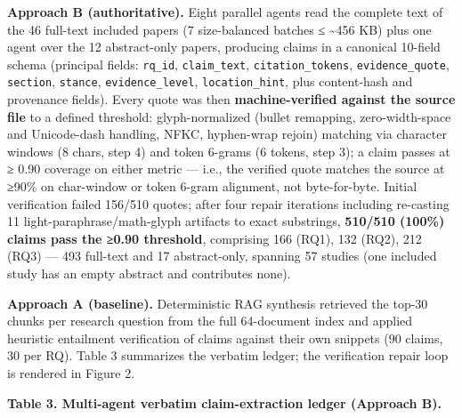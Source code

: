 \documentclass[11pt]{article}
\newcounter{none} %
\begin{document}
\textbf{Approach B (authoritative).} Eight parallel agents read the
complete text of the 46 full-text included papers (7 size-balanced
batches ≤ \textasciitilde456 KB) plus one agent over the 12
abstract-only papers, producing claims in a canonical 10-field schema
(principal fields: \texttt{rq\_id}, \texttt{claim\_text},
\texttt{citation\_tokens}, \texttt{evidence\_quote}, \texttt{section},
\texttt{stance}, \texttt{evidence\_level}, \texttt{location\_hint}, plus
content-hash and provenance fields). Every quote was then
\textbf{machine-verified against the source file} to a defined
threshold: glyph-normalized (bullet remapping, zero-width-space and
Unicode-dash handling, NFKC, hyphen-wrap rejoin) matching via character
windows (8 chars, step 4) and token 6-grams (6 tokens, step 3); a claim
passes at ≥ 0.90 coverage on either metric --- i.e., the verified quote
matches the source at ≥90\% on char-window or token 6-gram alignment,
not byte-for-byte. Initial verification failed 156/510 quotes; after
four repair iterations including re-casting 11
light-paraphrase/math-glyph artifacts to exact substrings,
\textbf{510/510 (100\%) claims pass the ≥0.90 threshold}, comprising 166
(RQ1), 132 (RQ2), 212 (RQ3) --- 493 full-text and 17 abstract-only,
spanning 57 studies (one included study has an empty abstract and
contributes none).

\textbf{Approach A (baseline).} Deterministic RAG synthesis retrieved
the top-30 chunks per research question from the full 64-document index
and applied heuristic entailment verification of claims against their
own snippets (90 claims, 30 per RQ). Table 3 summarizes the verbatim
ledger; the verification repair loop is rendered in Figure 2.

\textbf{Table 3. Multi-agent verbatim claim-extraction ledger (Approach
B).}
\end{document}

